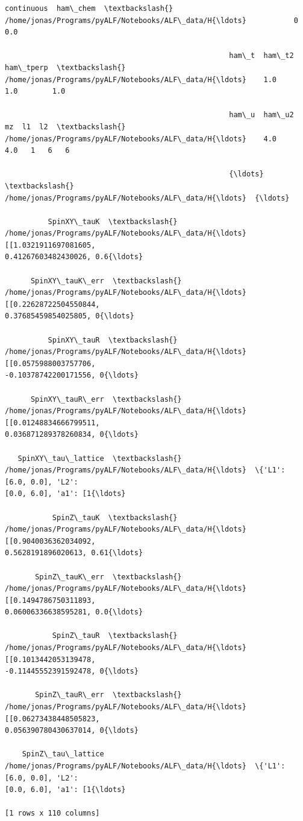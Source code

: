             \begin{tcolorbox}[breakable, size=fbox, boxrule=.5pt, pad at break*=1mm, opacityfill=0]
\begin{Verbatim}[commandchars=\\\{\}]
                                                    continuous  ham\_chem  \textbackslash{}
/home/jonas/Programs/pyALF/Notebooks/ALF\_data/H{\ldots}           0       0.0

                                                    ham\_t  ham\_t2  ham\_tperp  \textbackslash{}
/home/jonas/Programs/pyALF/Notebooks/ALF\_data/H{\ldots}    1.0     1.0        1.0

                                                    ham\_u  ham\_u2  mz  l1  l2  \textbackslash{}
/home/jonas/Programs/pyALF/Notebooks/ALF\_data/H{\ldots}    4.0     4.0   1   6   6

                                                    {\ldots}  \textbackslash{}
/home/jonas/Programs/pyALF/Notebooks/ALF\_data/H{\ldots}  {\ldots}

          SpinXY\_tauK  \textbackslash{}
/home/jonas/Programs/pyALF/Notebooks/ALF\_data/H{\ldots}  [[1.0321911697081605,
0.41267603482430026, 0.6{\ldots}

      SpinXY\_tauK\_err  \textbackslash{}
/home/jonas/Programs/pyALF/Notebooks/ALF\_data/H{\ldots}  [[0.22628722504550844,
0.37685459854025805, 0{\ldots}

          SpinXY\_tauR  \textbackslash{}
/home/jonas/Programs/pyALF/Notebooks/ALF\_data/H{\ldots}  [[0.0575988003757706,
-0.10378742200171556, 0{\ldots}

      SpinXY\_tauR\_err  \textbackslash{}
/home/jonas/Programs/pyALF/Notebooks/ALF\_data/H{\ldots}  [[0.01248834666799511,
0.036871289378260834, 0{\ldots}

   SpinXY\_tau\_lattice  \textbackslash{}
/home/jonas/Programs/pyALF/Notebooks/ALF\_data/H{\ldots}  \{'L1': [6.0, 0.0], 'L2':
[0.0, 6.0], 'a1': [1{\ldots}

           SpinZ\_tauK  \textbackslash{}
/home/jonas/Programs/pyALF/Notebooks/ALF\_data/H{\ldots}  [[0.9040036362034092,
0.5628191896020613, 0.61{\ldots}

       SpinZ\_tauK\_err  \textbackslash{}
/home/jonas/Programs/pyALF/Notebooks/ALF\_data/H{\ldots}  [[0.1494786750311893,
0.06006336638595281, 0.0{\ldots}

           SpinZ\_tauR  \textbackslash{}
/home/jonas/Programs/pyALF/Notebooks/ALF\_data/H{\ldots}  [[0.1013442053139478,
-0.11445552391592478, 0{\ldots}

       SpinZ\_tauR\_err  \textbackslash{}
/home/jonas/Programs/pyALF/Notebooks/ALF\_data/H{\ldots}  [[0.06273438448505823,
0.056390780430637014, 0{\ldots}

    SpinZ\_tau\_lattice
/home/jonas/Programs/pyALF/Notebooks/ALF\_data/H{\ldots}  \{'L1': [6.0, 0.0], 'L2':
[0.0, 6.0], 'a1': [1{\ldots}

[1 rows x 110 columns]
\end{Verbatim}
\end{tcolorbox}
        
